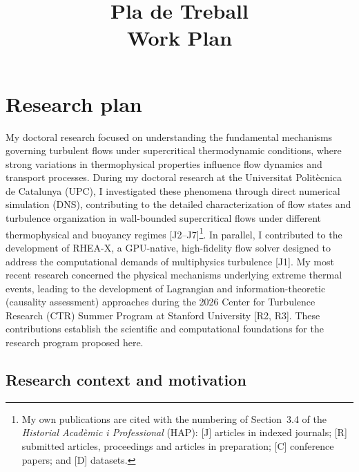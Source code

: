 \documentclass[11pt]{article}
\title{\textbf{Pla de Treball}\\[2pt]\large Work Plan}
\author{\Large \CandName}
\date{}
\begin{document}
\maketitle
\thispagestyle{plain}
\vspace{0.5cm}
\begin{center}\postdata\end{center}

\newpage
\tableofcontents

\section{Research plan}\label{sec:research}

My doctoral research focused on understanding the fundamental mechanisms governing turbulent flows under supercritical thermodynamic conditions, where strong variations in thermophysical properties influence flow dynamics and transport processes.
During my doctoral research at the Universitat Politècnica de Catalunya (UPC), I investigated these phenomena through direct numerical simulation (DNS), contributing to the detailed characterization of flow states and turbulence organization in wall-bounded supercritical flows under different thermophysical and buoyancy regimes [J2--J7]\footnote{My own publications are cited with the numbering of Section~3.4 of the \textit{Historial Acadèmic i Professional} (HAP): [J] articles in indexed journals; [R] submitted articles, proceedings and articles in preparation; [C] conference papers; and [D] datasets.}.
In parallel, I contributed to the development of RHEA-X, a GPU-native, high-fidelity flow solver designed to address the computational demands of multiphysics turbulence [J1].
My most recent research concerned the physical mechanisms underlying extreme thermal events, leading to the development of Lagrangian and information-theoretic (causality assessment) approaches during the 2026 Center for Turbulence Research (CTR) Summer Program at Stanford University [R2, R3].
These contributions establish the scientific and computational foundations for the research program proposed here.

\subsection{Research context and motivation}\label{sec:background}
\end{document}
